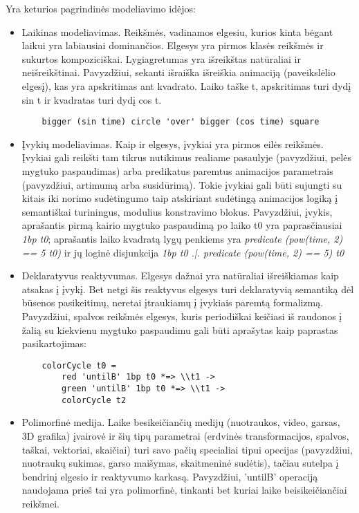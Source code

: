 
Yra keturios pagrindinės modeliavimo idėjos:

\begin{itemize}

	\item Laikinas modeliavimas. Reikšmės, vadinamos elgesiu, kurios kinta bėgant laikui yra labiausiai dominančios. Elgesys yra pirmos klasės reikšmės ir sukurtos kompoziciškai. Lygiagretumas yra išreikštas natūraliai ir neišreikštinai. Pavyzdžiui, sekanti išraiška išreiškia animaciją (paveikslėlio elgesį), kas yra apskritimas ant kvadrato. Laiko taške t, apskritimas turi dydį sin t ir kvadratas turi dydį cos t.

\begin{lstlisting}
	bigger (sin time) circle 'over' bigger (cos time) square
\end{lstlisting}

	\item Įvykių modeliavimas. Kaip ir elgesys, įvykiai yra pirmos eilės reikšmės. Įvykiai gali reikšti tam tikrus nutikimus realiame pasaulyje (pavyzdžiui, pelės mygtuko paspaudimas) arba predikatus paremtus animacijos parametrais (pavyzdžiui, artimumą arba susidūrimą). Tokie įvykiai gali būti sujungti su kitais iki norimo sudėtingumo taip atskiriant sudėtingą animacijos logiką į semantiškai turiningus, modulius konstravimo blokus. Pavyzdžiui, įvykis, aprašantis pirmą kairio mygtuko paspaudimą po laiko t0 yra paprasčiausiai \textit{1bp t0}; aprašantis laiko kvadratą lygų penkiems yra \textit{predicate (pow(time, 2) == 5 t0)} ir jų loginė disjunkcija \textit{1bp t0 .|. predicate (pow(time, 2) == 5) t0}

	\item Deklaratyvus reaktyvumas. Elgesys dažnai yra natūraliai išreiškiamas kaip atsakas į įvykį. Bet netgi šis reaktyvus elgesys turi deklaratyvią semantiką dėl būsenos pasikeitimų, neretai įtraukiamų į įvykiais paremtą formalizmą. Pavyzdžiui, spalvos reikšmės elgesys, kuris periodiškai keičiasi iš raudonos į žalią su kiekvienu mygtuko paspaudimu gali būti aprašytas kaip paprastas pasikartojimas:

\begin{lstlisting}
	colorCycle t0 =
		red 'untilB' 1bp t0 *=> \\t1 ->
		green 'untilB' 1bp t0 *=> \\t1 ->
		colorCycle t2
\end{lstlisting}

	\item Polimorfinė medija. Laike besikeičiančių medijų (nuotraukos, video, garsas, 3D grafika) įvairovė ir šių tipų parametrai (erdvinės transformacijos, spalvos, taškai, vektoriai, skaičiai) turi savo pačių specialiai tipui opecijas (pavyzdžiui, nuotraukų sukimas, garso maišymas, skaitmeninė sudėtis), tačiau sutelpa į bendrinį elgesio ir reaktyvumo karkasą. Pavyzdžiui, 'untilB' operaciją naudojama prieš tai yra polimorfinė, tinkanti bet kuriai laike beisikeičiančiai reikšmei.

\end{itemize}

